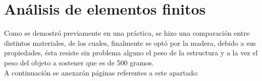 \documentclass[11pt,a4paper,oldfontcommands,oneside]{memoir}
\begin{document}


\section{Análisis de elementos finitos}
Como se demostró previamente en una práctica, se hizo una comparación entre distintos materiales, de los cuales, finalmente se optó por la madera, debido a sus propiedades, ésta resiste sin problema alguno el peso de la estructura y a la vez el peso del objeto a sostener que es de 500 gramos.\\
A continuación se anexarán páginas referentes a este apartado:





\end{document}
